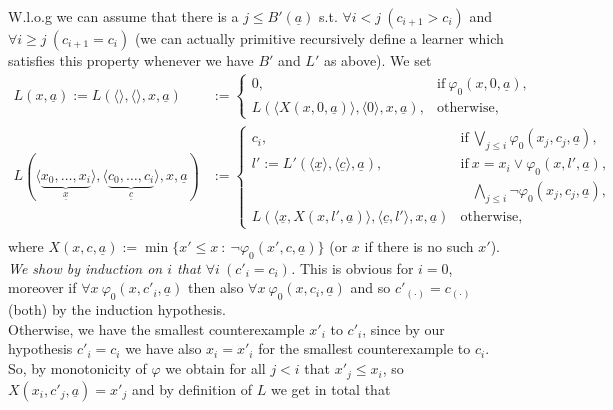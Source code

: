 \documentclass[1p]{elsarticle}
\newcommand{\tup}{\underline} %
\newcommand{\Tif}{\text{if}\ }
\newcommand{\Telse}{\text{otherwise}}
\theoremstyle{plain}
\theoremstyle{definition}
\theoremstyle{remark}
\renewenvironment{proof}[1][]{\noindent{\bf Proof{#1}. }}{\nopagebreak[4]{\hspace*{\fill}
  $\Box$              %
 }{\vspace{2ex}}}
\renewcommand{\phi}{\varphi}
\theoremstyle{definition}
\begin{document}
\begin{proof}
W.l.o.g we can assume that there is a $j\leq B'(\tup a)$ s.t. $\forall i<j\ (c_{i+1}>c_i)$ and $\forall i\geq j\ (c_{i+1}=c_i)$ (we can actually primitive recursively define a learner which satisfies this property whenever we have $B'$ and $L'$ as above). 
We set
\begin{align*}
L(x, \tup a):=L(\langle\rangle,\langle\rangle,x, \tup a)&:=\begin{cases}
0,&\Tif \phi_0(x,0,\tup a),\\
L( \langle X(x,0,\tup a)\rangle,\langle0\rangle,x,\tup a),&\Telse,\end{cases}\\
L(\langle \underbrace{x_0,\ldots,x_i}_{\tup x}\rangle, \langle \underbrace{c_0,\ldots,c_i}_{\tup c}\rangle,x,\tup a)&:=\begin{cases}
c_i,&\Tif \bigvee_{j\leq i}\phi_0(x_j,c_j,\tup a),\\
l':=L'(\langle {\tup x}\rangle, \langle {\tup c}\rangle,\tup a),&\Tif x=x_i\vee \phi_0(x,l',\tup a),\\
&\phantom{\Tif} \bigwedge_{j\leq i}\neg\phi_0(x_j,c_j,\tup a),\\
L( \langle {\tup x},X(x,l',\tup a)\rangle,
\langle \tup c,l'\rangle,x,\tup a) &\Telse,
\end{cases}\\
\end{align*}
where $X(x,c,\tup a):=\min\{x'\leq x\ :\ \neg \phi_0(x',c,\tup a)\}$ (or $x$ if there is no such $x'$).\\
{\em We show by induction on $i$ that $\forall i\ (c'_i = c_i)$.} This is obvious for $i=0$, moreover 
if $\forall x\ \phi_0(x,c'_{i},\tup a)$ then also $\forall x\ \phi_0(x,c_{i},\tup a)$ and so $c'_{(\cdot)}=c_{(\cdot)}$ (both) by the induction hypothesis.\\ Otherwise, we have the smallest counterexample $x'_i$ to $c'_i$, since by our hypothesis $c'_i=c_i$ we have also $x_i=x'_i$ for the smallest counterexample to $c_i$. 
So, by monotonicity of $\phi$ we obtain for all $j<i$ that $x'_j\leq x_i$, so $X(x_i,c'_j,\tup a)=x'_j$ and by definition of $L$ we get in total that 

\end{proof}
\end{document}
